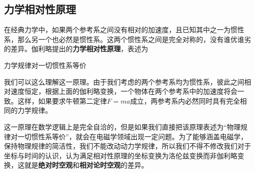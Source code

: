 \subsection{力学相对性原理}
在经典力学中，如果两个参考系之间没有相对的加速度，且已知其中之一为惯性系，那么另一个也必然是惯性系。这两个惯性系之间是完全对称的，没有谁优谁劣的差异。伽利略提出的\textbf{力学相对性原理}，表述为
\begin{center}
力学规律对一切惯性系等价
\end{center}

我们可以这么理解这一原理。由于我们考虑的两个参考系均为惯性系，彼此之间相对速度恒定，根据上面的伽利略变换，一个物体在两个参考系中的加速度将会一致。这样，如果要求牛顿第二定律$F=ma$成立，两参考系内必然同时具有完全相同的力学规律。

这一原理在数学逻辑上是完全自洽的，但是如果我们直接把该原理表述为“物理规律对一切惯性系等价”，就会在电磁学领域出现一定问题。为了能够涵盖电磁学，保持物理规律的简洁性，我们不能改动动力学规律，所以我们不得不修改我们对于坐标与时间的认识，认为满足相对性原理的坐标变换为洛伦兹变换而非伽利略变换，这就是\textbf{绝对时空观}和\textbf{相对论时空观}的差异。